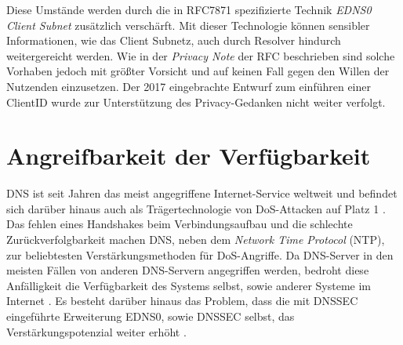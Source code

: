 Diese Umstände werden durch die in RFC7871\cite{RFC7871} spezifizierte Technik \textit{EDNS0 Client Subnet} zusätzlich verschärft. Mit dieser Technologie können sensibler Informationen, wie das Client Subnetz, auch durch Resolver hindurch weitergereicht werden. Wie in der \textit{Privacy Note} der RFC beschrieben sind solche Vorhaben jedoch mit größter Vorsicht und auf keinen Fall gegen den Willen der Nutzenden einzusetzen. Der 2017 eingebrachte Entwurf zum einführen einer ClientID\cite{Licht2017} wurde zur Unterstützung des Privacy-Gedanken nicht weiter verfolgt.

\section{Angreifbarkeit der Verfügbarkeit}
\label{sec:thread-dosamp}

DNS ist seit Jahren das meist angegriffene Internet-Service weltweit und befindet sich darüber hinaus auch als Trägertechnologie von DoS-Attacken auf Platz 1 \cite{Alcoy2017}. Das fehlen eines Handshakes beim Verbindungsaufbau und die schlechte Zurückverfolgbarkeit machen DNS, neben dem \textit{Network Time Protocol} (NTP), zur beliebtesten Verstärkungsmethoden für DoS-Angriffe. Da DNS-Server in den meisten Fällen von anderen DNS-Servern angegriffen werden, bedroht diese Anfälligkeit die Verfügbarkeit des Systems selbst, sowie anderer Systeme im Internet \cite{Kambourakis2008}. Es besteht darüber hinaus das Problem, dass die mit DNSSEC eingeführte Erweiterung EDNS0, sowie DNSSEC selbst, das Verstärkungspotenzial weiter erhöht \cite{Anagnostopoulos2013}\cite{VanRijswijk-Deij2014}.
